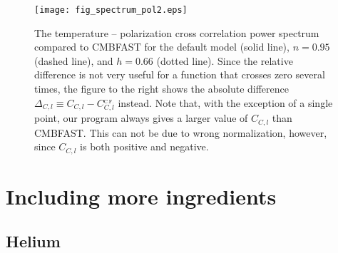 \documentclass[twocolumn,nofootinbib,amsmath,amssymb]{revtex4}
\begin{document}
\begin{widetext}
\begin{figure}[!h]
  \begin{center}
    \texttt{[image: fig\_spectrum\_pol2.eps]}
  \end{center}
  \vspace{-6mm}
  \caption{The temperature -- polarization cross correlation power spectrum
  compared to CMBFAST for the default model (solid line), $n = 0.95$ (dashed
  line), and $h = 0.66$ (dotted line). Since the relative difference is not
  very useful for a function that crosses zero several times, the figure to the
  right shows the absolute difference $\Delta_{C,l} \equiv C_{C,l} -
  C_{C,l}^{_{\mathrm{C.F.}}}$ instead. Note that, with the exception of a
  single point, our program always gives a larger value of $C_{C,l}$ than
  CMBFAST. This can not be due to wrong normalization, however, since $C_{C,l}$
  is both positive and negative.}
  \label{fig:cross_power}
\end{figure}
\end{widetext}


\section{Including more ingredients}
\label{cha:more_ingredients}

\subsection{Helium}
\label{cha:helium}
\end{document}
